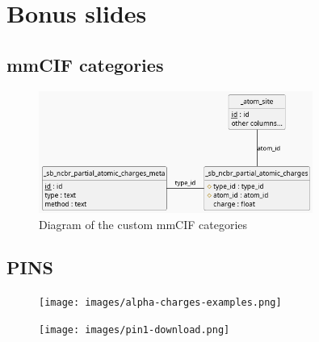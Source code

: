 \documentclass[
]{beamer}
\begin{document}
\section[Bonus slides]{Bonus slides}

\subsection[mmCIF categories]{mmCIF categories}

\begin{frame}{}
  \begin{figure}
    \includegraphics[width=0.8\textwidth,keepaspectratio]{images/mmcif_erd.png}
    \caption{Diagram of the custom mmCIF categories}
  \end{figure}
\end{frame}

\subsection[PINS]{PINS}

\begin{frame}
  \begin{figure}
    \texttt{[image: images/alpha-charges-examples.png]}
  \end{figure}
\end{frame}

\begin{frame}
  \begin{figure}
    \texttt{[image: images/pin1-download.png]}
  \end{figure}
\end{frame}
\end{document}
